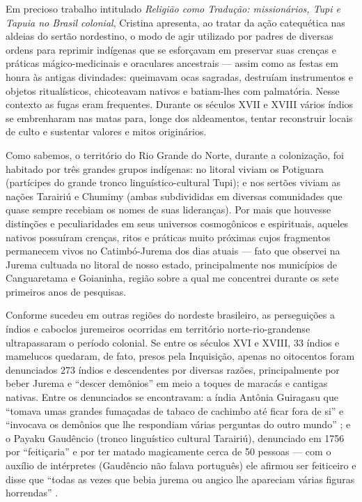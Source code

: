 \begin{refsection}
    Em precioso trabalho intitulado \textit{Religião como Tradução: missionários, Tupi e Tapuia no Brasil colonial}, Cristina \textcite[p.~379--406]{Pompa2003Religiao} apresenta, ao tratar da ação catequética nas aldeias do sertão nordestino, o modo de agir utilizado por padres de diversas ordens para reprimir indígenas que se esforçavam em preservar suas crenças e práticas mágico-medicinais e oraculares ancestrais --- assim como as festas em honra às antigas divindades: queimavam ocas sagradas, destruíam instrumentos e objetos ritualísticos, chicoteavam nativos e batiam-lhes com palmatória. Nesse contexto as fugas eram frequentes. Durante os séculos XVII e XVIII vários índios se embrenharam nas matas para, longe dos aldeamentos, tentar reconstruir locais de culto e sustentar valores e mitos originários. 

    Como sabemos, o território do Rio Grande do Norte, durante a colonização, foi habitado por três grandes grupos indígenas: no litoral viviam os Potiguara (partícipes do grande tronco linguístico-cultural Tupi); e nos sertões viviam as nações Tarairiú e Chumimy (ambas subdivididas em diversas comunidades que quase sempre recebiam os nomes de suas lideranças). Por mais que houvesse distinções e peculiaridades em seus universos cosmogônicos e espirituais, aqueles nativos possuíram crenças, ritos e práticas muito próximas cujos fragmentos permanecem vivos no Catimbó-Jurema dos dias atuais --- fato que observei na Jurema cultuada no litoral de nosso estado, principalmente nos municípios de Canguaretama e Goianinha, região sobre a qual me concentrei durante os sete primeiros anos de pesquisas. 

    Conforme sucedeu em outras regiões do nordeste brasileiro, as perseguições a índios e caboclos juremeiros ocorridas em território norte-rio-grandense ultrapassaram o período colonial. Se entre os séculos XVI e XVIII, 33 índios e mamelucos quedaram, de fato, presos pela Inquisição, apenas no oitocentos foram denunciados 273 índios e descendentes por diversas razões, principalmente por beber Jurema e ``descer demônios'' em meio a toques de maracás e cantigas nativas. Entre os denunciados se encontravam: a índia Antônia Guiragasu que ``tomava umas grandes fumaçadas de tabaco de cachimbo até ficar fora de si'' e ``invocava os demônios que lhe respondiam várias perguntas do outro mundo'' ; e o Payaku Gaudêncio (tronco linguístico cultural Tarairiú), denunciado em 1756 por ``feitiçaria'' e por ter matado magicamente cerca de 50 pessoas --- com o auxílio de intérpretes (Gaudêncio não falava português) ele afirmou ser feiticeiro e disse que ``todas as vezes que bebia jurema ou angico lhe apareciam várias figuras horrendas'' .


\end{refsection}
